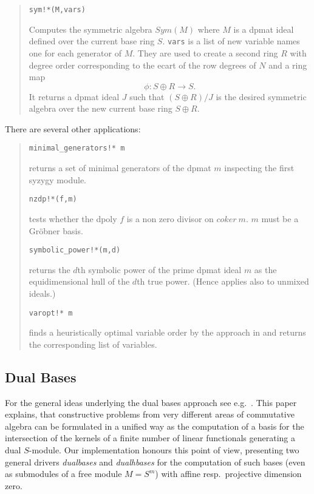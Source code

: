 \documentclass[a4paper,11pt]{article}
\newcommand{\gr}{Gr\"obner}
\newcommand{\ind}[1]{{\em #1}\index{#1}}
\newcommand{\pbx}[1]{\mbox{}\hfill \parbox[t]{12cm}{#1} \pagebreak[3]}
\begin{document}
\begin{quote}
\verb|sym!*(M,vars)|

\pbx{Computes the symmetric algebra $Sym(M)$ where $M$ is a dpmat ideal
defined over the current base ring $S$. {\tt vars} is a list of new
variable names one for each generator of $M$. They are used to create
a second ring $R$ with degree order corresponding to the ecart of the
row degrees of $N$ and a ring map
\[\phi : S\oplus R\longrightarrow S.\]
It returns a dpmat ideal $J$ such that $(S\oplus R)/J$ is the
desired symmetric algebra over the new current base ring $S\oplus R$.}
       
\end{quote}


There are several other applications:
\begin{quote}
\verb|minimal_generators!* m| 

\pbx{returns a set of minimal generators of the dpmat $m$ inspecting
the first syzygy module.}

\verb|nzdp!*(f,m)| 

\pbx{tests whether the dpoly $f$ is a non zero divisor on $coker\
m$. $m$ must be a {\gr} basis.} 

\verb|symbolic_power!*(m,d)| 

\pbx{returns the $d$\/th symbolic power of the prime dpmat ideal $m$ as
the equidimensional hull of the $d$\/th true power. (Hence applies also
to unmixed ideals.)}

\verb|varopt!* m| 

\pbx{finds a heuristically optimal variable order by the approach in
\cite{BGK} and returns the corresponding list of variables.} 
\end{quote}


\subsection{Dual Bases}


For the general ideas underlying the dual bases approach see e.g.\
\cite{MMM}. This paper explains, that constructive problems from very
different areas of commutative algebra can be formulated in a unified
way as the computation of a basis for the intersection of the kernels
of a finite number of linear functionals generating a dual
$S$-module. Our implementation honours 
this point of view, presenting two general drivers \ind{dualbases} and
\ind{dualhbases} for the computation of such bases (even as submodules
of a free module $M=S^m$) with affine resp.\ projective dimension zero.
\end{document}
